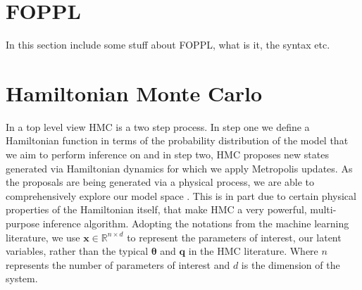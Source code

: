 \documentclass[twoside]{article}
\begin{document}
\section{FOPPL}
\label{sec:foppl}
In this section include some stuff about FOPPL, what is it, the syntax etc.  
\section{Hamiltonian Monte Carlo}
\label{sec:hmc}
In a top level view HMC is a two step process. In step one we define a Hamiltonian function in terms of the probability distribution of the model that we aim to perform inference on and in step two, HMC proposes new states generated via Hamiltonian dynamics for which we apply Metropolis updates. As the proposals are being generated via a physical process, we are able to comprehensively explore our model space \citep{neal2011mcmc}. This is in part due to certain physical properties of the Hamiltonian itself, that make HMC a very powerful, multi-purpose inference algorithm. Adopting the notations from the machine learning literature, we use $\textbf{x} \in \mathbb{R}^{n \times d}$ to represent the parameters of interest, our latent variables, rather than the typical $\mathbf{\theta}$ and $\textbf{q}$ in the HMC literature. Where $n$ represents the number of parameters of interest and $d$ is the dimension of the system.
\end{document}
